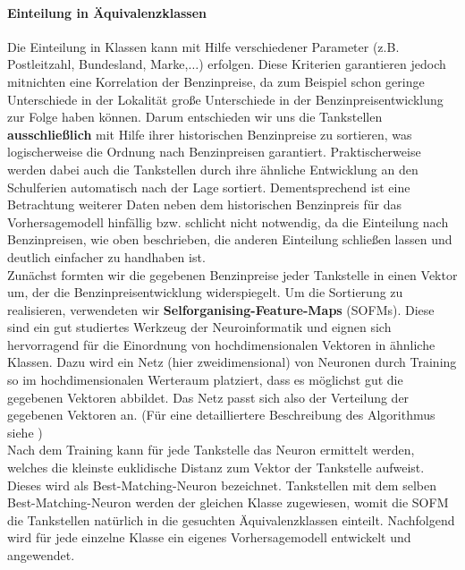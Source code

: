 \documentclass[11pt]{article}
\begin{document}
	\paragraph{Einteilung in Äquivalenzklassen\\}
	Die Einteilung in Klassen kann mit Hilfe verschiedener Parameter (z.B. Postleitzahl, Bundesland, Marke,$\ldots$) erfolgen. Diese Kriterien garantieren jedoch mitnichten eine Korrelation der Benzinpreise, da zum Beispiel schon geringe Unterschiede in der Lokalität große Unterschiede in der Benzinpreisentwicklung zur Folge haben können. Darum entschieden wir uns die Tankstellen \textbf{ausschließlich} mit Hilfe ihrer historischen Benzinpreise zu sortieren, was logischerweise die Ordnung nach Benzinpreisen garantiert. Praktischerweise werden dabei auch die Tankstellen durch ihre ähnliche Entwicklung an den Schulferien automatisch nach der Lage sortiert. Dementsprechend ist eine Betrachtung weiterer Daten neben dem historischen Benzinpreis für das Vorhersagemodell hinfällig bzw. schlicht nicht notwendig, da die Einteilung nach Benzinpreisen, wie oben beschrieben, die anderen Einteilung schließen lassen und deutlich einfacher zu handhaben ist. \\
	Zunächst formten wir die gegebenen Benzinpreise jeder Tankstelle in einen Vektor um, der die Benzinpreisentwicklung widerspiegelt. Um die Sortierung zu realisieren, verwendeten wir \textbf{Selforganising-Feature-Maps} (SOFMs). Diese sind ein gut studiertes Werkzeug der Neuroinformatik und eignen sich hervorragend für die Einordnung von hochdimensionalen Vektoren in ähnliche Klassen. Dazu wird ein Netz (hier zweidimensional) von Neuronen durch Training so im hochdimensionalen Werteraum platziert, dass es möglichst gut die gegebenen Vektoren abbildet. Das Netz passt sich also der Verteilung der gegebenen Vektoren an. (Für eine detailliertere Beschreibung des Algorithmus siehe \cite{SOFM})\\
	Nach dem Training kann für jede Tankstelle das Neuron ermittelt werden, welches die kleinste euklidische Distanz zum Vektor der Tankstelle aufweist. Dieses wird als \glqq Best-Matching-Neuron\glqq{} bezeichnet. Tankstellen mit dem selben Best-Matching-Neuron werden der gleichen Klasse zugewiesen, womit die SOFM die Tankstellen natürlich in die gesuchten Äquivalenzklassen einteilt. Nachfolgend wird für jede einzelne Klasse ein eigenes Vorhersagemodell entwickelt und angewendet.\\
	
\end{document}
